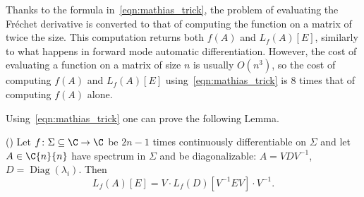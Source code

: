 Thanks to the formula in~\eqref{eqn:mathias_trick}, the problem of evaluating the Fréchet derivative is converted to that of computing the function on a matrix of twice the size. This computation returns both $f(A)$ and $L_f(A)[E]$, similarly to what happens in forward mode automatic differentiation.
However, the cost of evaluating a function on a matrix of size $n$ is usually $O(n^3)$, so the cost of computing $f(A)$ and $L_f(A)[E]$ using~\eqref{eqn:mathias_trick} is $8$ times that of computing $f(A)$ alone.

Using~\eqref{eqn:mathias_trick} one can prove the following Lemma.
\begin{lemma}(\cite[Cor.~3.12]{higham:matfun_book})
	Let $f\colon\Sigma\subseteq\C\to\C$ be $2n-1$ times continuously differentiable on $\Sigma$ and let $A\in\C{n}{n}$ have spectrum in $\Sigma$ and be diagonalizable: $A=VDV^{-1}$, $D=\operatorname{Diag}(\lambda_i)$. Then 
	\[
		L_f(A)[E] = V\cdot L_f(D)[V^{-1}EV]\cdot V^{-1}.
	\]
\end{lemma}

